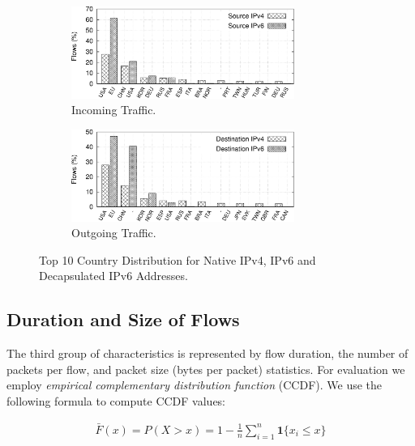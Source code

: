 \begin{figure}[!tb]
     \begin{subfigure}{\textwidth}
        \centering
        \includegraphics[width=0.8\textwidth]{figures/paper-tunnels/ctry_distribution/ctry_distribution-native-in}
        \caption{Incoming Traffic.}
        \label{fig:ipv6-tunnels-geo-native-in}
    \end{subfigure}
    \hfill
    \begin{subfigure}{\textwidth}
        \centering
        \includegraphics[width=0.8\textwidth]{figures/paper-tunnels/ctry_distribution/ctry_distribution-native-out}
        \caption{Outgoing Traffic.}
        \label{fig:ipv6-tunnels-geo-native-out}
    \end{subfigure}
    \caption{Top 10 Country Distribution for Native IPv4, IPv6 and Decapsulated IPv6 Addresses.}
    \label{fig:ipv6-tunnels-top-ten-geo}
\end{figure}

\subsection{Duration and Size of Flows}
The third group of characteristics is represented by flow duration, the number of packets per flow, and packet size (bytes per packet) statistics. For evaluation we employ \textit{empirical complementary distribution function} (CCDF). We use the following formula to compute CCDF values:

\begin{align}
    \bar{F}(x)= P(X>x)=1-\frac{1}{n}\sum^{n}_{i=1}\mathbf{1}\{x_{i}\leq x\}
\end{align}

